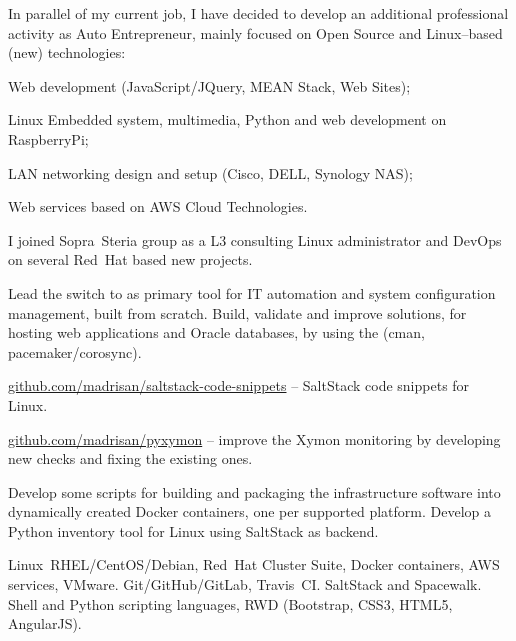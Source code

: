 

In parallel of my current job, I have decided to develop an additional professional
activity as Auto Entrepreneur, mainly focused on Open Source and Linux--based (new) technologies:

\item{\bdot} Web development (JavaScript/JQuery, MEAN Stack, Web Sites);
\item{\bdot} Linux Embedded system, multimedia, Python and web development on RaspberryPi;
\item{\bdot} LAN networking design and setup (Cisco, DELL, Synology NAS);
\item{\bdot} Web services based on AWS Cloud Technologies.



I joined Sopra~Steria group as a L3 consulting Linux administrator and DevOps on
several Red~Hat based new projects.

\smallskip\noindent
\tasks
Lead the switch to  as primary tool for IT automation and system
configuration management, built from scratch.
Build, validate and improve  solutions,
for hosting web applications and Oracle databases, by using the
 (cman, pacemaker/corosync).

\smallskip\noindent
\software
\url{github.com/madrisan/saltstack-code-snippets} --
SaltStack code snippets for Linux.

\tinyskip\noindent
\url{github.com/madrisan/pyxymon} --
improve the Xymon monitoring by developing new checks and fixing the
existing ones.

\tinyskip\noindent
Develop some scripts for building and packaging the infrastructure software
into dynamically created Docker containers, one per supported platform.
Develop a Python inventory tool for Linux using SaltStack as backend.

\tinyskip\noindent
\technologies
Linux~RHEL/CentOS/Debian, Red~Hat Cluster Suite, Docker containers,
AWS services, VMware. Git/GitHub/GitLab, Travis~CI. SaltStack and Spacewalk.
Shell and Python scripting languages, RWD (Bootstrap, CSS3, HTML5, AngularJS).

